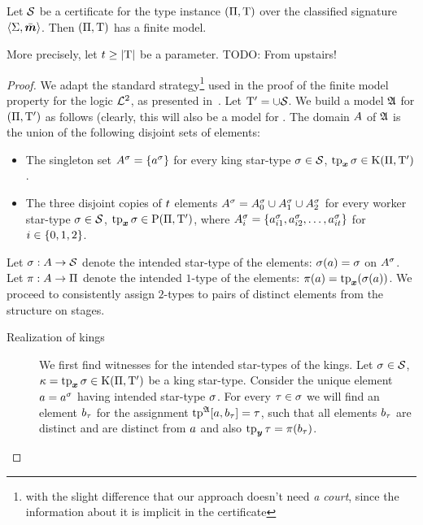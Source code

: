 \begin{lemma}\label{lem:cert-expand}
Let $\mathcal{S}$ be a certificate for the type instance $(\Pi,\mathrm{T})$ over the
classified signature $\left\langle \mathrm{\Sigma},\bar{\bm{m}} \right\rangle$.
Then $(\Pi,\mathrm{T})$ has a finite model.

More precisely, let $t \geq \left|\mathrm{T}\right|$ be a parameter.
TODO: From upstairs!
\end{lemma}
\begin{proof}
We adapt the standard strategy\footnote{with the slight difference that our
approach doesn't need \emph{a court}, since the information about it is implicit
in the certificate} used in the proof of the finite model property for the logic
$\mathcal{L}^{2}$, as presented in~\cite{gradel1999logics}.
Let ${\mathrm{T}'} = \cup\mathcal{S}$.
We build a model $\mathfrak{A}$ for $(\Pi,{\mathrm{T}'})$ as follows (clearly, this will
also be a model for .
The domain $A$ of $\mathfrak{A}$ is the union of the following disjoint sets of
elements:
\begin{itemize}
  \item The singleton set $A^{\sigma} = \left\{a^{\sigma}\right\}$ for every king
  star-type $\sigma\in\mathcal{S}$, $\operatorname{tp}_{\bm{x}}\sigma \in \mathrm{K}(\Pi,{\mathrm{T}'})$.
  \item The three disjoint copies of $t$ elements
  $A^{\sigma} = A^{\sigma}_{0} \cup A^{\sigma}_{1} \cup A^{\sigma}_{2}$ for every
  worker star-type $\sigma \in \mathcal{S}$, $\operatorname{tp}_{\bm{x}}\sigma \in \mathrm{P}(\Pi,{\mathrm{T}'})$, where
  $A^{\sigma}_{i} = \left\{a^{\sigma}_{i 1}, a^{\sigma}_{i 2}, \dots, a^{\sigma}_{i t}\right\}$
  for $i \in \left\{0,1,2\right\}$.
\end{itemize}
Let $\sigma : A \to \mathcal{S}$ denote the intended star-type of the elements:
$\sigma(a) = \sigma$ on $A^{\sigma}$.
Let $\pi : A \to \Pi$ denote the intended $1$-type of the elements:
$\pi(a) = \operatorname{tp}_{\bm{x}}(\sigma(a))$.
We proceed to consistently assign $2$-types to pairs of distinct elements from
the structure on stages.
\begin{description}
  \item[Realization of kings] We first find witnesses for the intended
  star-types of the kings.
  Let $\sigma \in \mathcal{S}$, $\kappa = \operatorname{tp}_{\bm{x}}\sigma \in \mathrm{K}(\Pi,{\mathrm{T}'})$
  be a king star-type.
  Consider the unique element $a = a^\sigma$ having intended star-type
  $\sigma$.
  For every $\tau \in \sigma$ we will find an element $b_{\tau}$ for the
  assignment $\operatorname{tp}^{\mathfrak{A}}[a,b_{\tau}] = \tau$, such that all elements
  $b_{\tau}$ are distinct and are distinct from $a$ and also $\operatorname{tp}_{\bm{y}}\tau =
  \pi(b_{\tau})$.
  \begin{enumerate}

\end{enumerate}
\end{description}
\end{proof}
